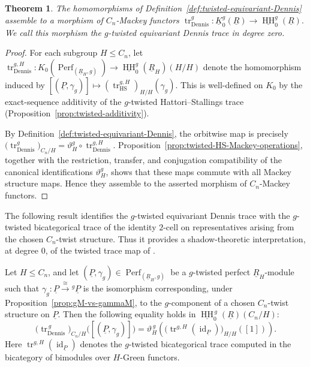 \documentclass[11pt,oneside]{amsart}
\DeclareMathOperator{\HH}{HH}
\DeclareMathOperator{\Perf}{Perf}
\DeclareMathOperator{\tr}{tr}
\DeclareMathOperator{\id}{id}
\numberwithin{equation}{section}
\numberwithin{figure}{section}
\theoremstyle{plain}
\newtheorem{thm}{Theorem}[section]
\theoremstyle{definition}
\theoremstyle{remark}
\begin{document}
\begin{thm}\label{thm:twisted-equivariant-Dennis}
The homomorphisms of Definition~\ref{def:twisted-equivariant-Dennis} assemble
to a morphism of \(C_n\)-Mackey functors
\(
\tr_{\mathrm{Dennis}}^g\colon
\underline K_0^g(\underline R)
\to
\underline{\HH}_0^g(\underline R).
\)
We call this morphism the \emph{\(g\)-twisted equivariant Dennis trace in
degree zero}.
\end{thm}

\begin{proof}
For each subgroup \(H\le C_n\), let
\(
\tr_{\mathrm{Dennis}}^{g,H}\colon
K_0(\Perf_{(\underline R_H,g)})
\to
\underline{\HH}_0^g(\underline R_H)(H/H)
\)
denote the homomorphism induced by
\(
[(\underline P,\gamma_{g})]
\mapsto
(\tr_{\mathrm{HS}}^{g,H})_{H/H}
(\gamma_{g}).
\)
This is well-defined on \(K_0\) by the exact-sequence additivity of
the \(g\)-twisted Hattori--Stallings trace
(Proposition~\ref{prop:twisted-additivity}).

By Definition~\ref{def:twisted-equivariant-Dennis}, the orbitwise map is precisely
\(
\bigl(\tr_{\mathrm{Dennis}}^g\bigr)_{C_n/H} = \vartheta_H^g\circ\tr_{\mathrm{Dennis}}^{g,H}.
\)
Proposition~\ref{prop:twisted-HS-Mackey-operations}, together with the restriction, transfer, and conjugation compatibility of the canonical identifications \(\vartheta_H^g\), shows that these maps commute with all Mackey structure maps. Hence they assemble to the asserted morphism of \(C_n\)-Mackey functors.
\end{proof}


The following result identifies the \(g\)-twisted equivariant Dennis trace
with the \(g\)-twisted bicategorical trace of the identity \(2\)-cell on
representatives arising from the chosen \(C_n\)-twist structure. Thus it
provides a shadow-theoretic interpretation, at degree \(0\), of the
twisted trace map of \cite{AGHKK}.


\begin{cor}
    \label{corollary:twDennis-equals-twTrace-levelwise}
Let \(H\le C_n\), and let
\(
(\underline P,\gamma_{g})
\in
\Perf_{(\underline R_H,g)}
\)
be a \(g\)-twisted perfect \(\underline R_H\)-module such that
\(
\gamma_{g}\colon
\underline P\xrightarrow{\cong}{}^g\underline P
\)
is the isomorphism corresponding, under
Proposition~\ref{prop:gM-vs-gammaM}, to the \(g\)-component of a chosen
\(C_n\)-twist structure on \(\underline P\).  Then the following equality holds
in \(\underline{\HH}^{\,g}_0(\underline R)(C_n/H)\):
\[
\bigl(\tr_{\mathrm{Dennis}}^{\,g}\bigr)_{C_n/H}
\bigl([(\underline P,\gamma_{g})]\bigr)
=
\vartheta_H^{\,g}
\left(
\bigl(\tr^{g,H}(\id_{\underline P})\bigr)_{H/H}([1])
\right).
\]
Here \(\tr^{g,H}(\id_{\underline P})\) denotes the \(g\)-twisted
bicategorical trace computed in the bicategory of bimodules over
\(H\)-Green functors.
\end{cor}
\end{document}
